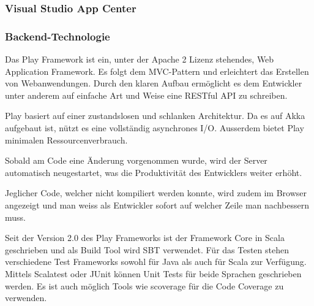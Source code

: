 \subsubsection{Visual Studio App Center}


\subsubsection{Backend-Technologie}
Das Play Framework \cite{PlayFramework} ist ein, unter der Apache 2 Lizenz stehendes, Web Application Framework. Es folgt dem MVC-Pattern und erleichtert das Erstellen von Webanwendungen. Durch den klaren Aufbau ermöglicht es dem Entwickler unter anderem auf einfache Art und Weise eine RESTful API zu schreiben. 

Play basiert auf einer zustandslosen und schlanken Architektur. Da es auf Akka aufgebaut ist, nützt es eine vollständig asynchrones I/O. Ausserdem bietet Play minimalen Ressourcenverbrauch. 

Sobald am Code eine Änderung vorgenommen wurde, wird der Server automatisch neugestartet, was die Produktivität des Entwicklers  weiter erhöht.

Jeglicher Code, welcher nicht kompiliert werden konnte, wird zudem im Browser angezeigt und man weiss als Entwickler sofort auf welcher Zeile man nachbessern muss. 

Seit der Version 2.0 des Play Frameworks ist der Framework Core in Scala geschrieben und als Build Tool wird SBT verwendet. Für das Testen stehen verschiedene Test Frameworks sowohl für Java als auch für Scala zur Verfügung. Mittels Scalatest oder JUnit können Unit Tests für beide Sprachen geschrieben werden. Es ist auch möglich Tools wie scoverage für die Code Coverage zu verwenden. 
